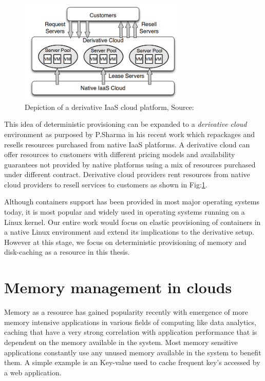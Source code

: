     \begin{figure}
      \centering
      \includegraphics[width=0.7\textwidth]{images/intro/derivative_cloud.png}
      \caption{Depiction of a derivative IaaS cloud platform, Source:\cite{sharma2015spotcheck}}
      \label{img_derivative_cloud}
    \end{figure}

    This idea of deterministic provisioning can be expanded to a \textit{derivative cloud} environment as purposed by P.Sharma in his 
recent work \cite{sharma2015spotcheck} which repackages and resells resources purchased from native IaaS platforms. A derivative cloud can 
offer resources to customers with different pricing models and availability guarantees not provided by native platforms using a mix of 
resources purchased under different contract. Derivative cloud providers rent resources from native cloud providers to resell services to 
customers as shown in Fig:\ref{img_derivative_cloud}.

    Although containers support has been provided in most major operating systems today, it is most popular and widely used in operating 
systems running on a Linux kernel. Our entire work would focus on elastic provisioning of containers in a native Linux environment and 
extend its implications to the derivative setup. However at this stage, we focus on deterministic provisioning of memory and disk-caching 
as a resource in this thesis.

  \section{Memory management in clouds}
  
    Memory as a resource has gained popularity recently with emergence of more memory intensive applications in various fields of 
computing like data analytics, caching that have a very strong correlation with application performance that is dependent on the memory 
available in the system. Most memory sensitive applications constantly use any unused memory available in the system to benefit them. A 
simple example is an Key-value used to cache frequent key's accessed by a web application. 

